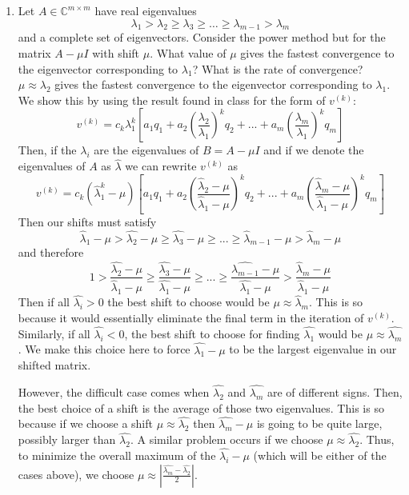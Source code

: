 \documentclass[12pt]{article}
\numberwithin{equation}{section}
\newcommand{\abs}[1]{\left\vert#1\right\vert}
\begin{document}
\begin{enumerate}
    \item Let $A\in\mathbb{C}^{m\times m}$ have real eigenvalues
    $$\lambda_1>\lambda_2\geq\lambda_3\geq\dots\geq \lambda_{m-1}>\lambda_m$$
    and a complete set of eigenvectors. Consider the power method but for the matrix $A-\mu I$ with shift $\mu$. What value of $\mu$ gives the fastest convergence to the eigenvector corresponding to $\lambda_1$? What is the rate of convergence?\\

    $\mu\approx\lambda_2$ gives the fastest convergence to the eigenvector corresponding to $\lambda_1$. We show this by using the result found in class for the form of $v^{(k)}$:
    $$v^{(k)}=c_k\lambda_1^k[a_1q_1+a_2\left(\frac{\lambda_2}{\lambda_1}\right)^kq_2+...+a_m\left(\frac{\lambda_m}{\lambda_1}\right)^kq_m]$$
    Then, if the $\lambda_i$ are the eigenvalues of $B=A-\mu I$ and if we denote the eigenvalues of $A$ as $\hat{\lambda}$ we can rewrite $v^{(k)}$ as
    $$v^{(k)}=c_k(\hat{\lambda}_1^k-\mu)[a_1q_1+a_2\left(\frac{\hat{\lambda}_2-\mu}{\hat{\lambda}_1-\mu}\right)^kq_2+...+a_m\left(\frac{\hat{\lambda}_m-\mu}{\hat{\lambda}_1-\mu}\right)^kq_m]$$
    Then our shifts must satisfy
    $$\hat{\lambda}_1-\mu>\hat{\lambda_2}-\mu\geq\hat{\lambda_3}-\mu\geq ...\geq \hat{\lambda}_{m-1}-\mu>\hat{\lambda}_m-\mu$$
    and therefore
    $$1>\frac{\hat{\lambda_2}-\mu}{\hat{\lambda}_1-\mu}\geq\frac{\hat{\lambda_3}-\mu}{\hat{\lambda_1}-\mu}\geq ...\geq \frac{\hat{\lambda_{m-1}}-\mu}{\hat{\lambda_1}-\mu}>\frac{\hat{\lambda}_m-\mu}{\hat{\lambda}_1-\mu}$$
    Then if all $\hat{\lambda_i}>0$ the best shift to choose would be $\mu\approx \hat{\lambda}_m$. This is so because it would essentially eliminate the final term in the iteration of $v^{(k)}$. Similarly, if all $\hat{\lambda_i}<0$, the best shift to choose for finding $\hat{\lambda_1}$ would be $\mu\approx \hat{\lambda_m}$. We make this choice here to force $\hat{\lambda_1}-\mu$ to be the largest eigenvalue in our shifted matrix.

    However, the difficult case comes when $\hat{\lambda_2}$ and $\hat{\lambda_m}$ are of different signs. Then, the best choice of a shift is the average of those two eigenvalues. This is so because if we choose a shift $\mu\approx \hat{\lambda_2}$ then $\hat{\lambda_m}-\mu$ is going to be quite large, possibly larger than $\hat{\lambda_2}$. A similar problem occurs if we choose $\mu\approx\hat{\lambda_2}$. Thus, to minimize the overall maximum of the $\hat{\lambda_i}-\mu$ (which will be either of the cases above), we choose $\mu\approx\abs{\frac{\hat{\lambda_m}-\hat{\lambda_2}}{2}}$.


\end{enumerate}
\end{document}
